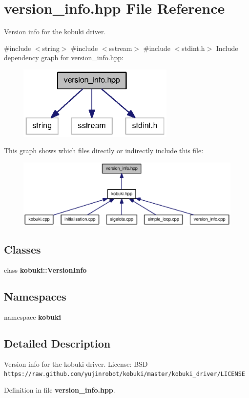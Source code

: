 \section{version\-\_\-info.\-hpp \-File \-Reference}
\label{version__info_8hpp}


\-Version info for the kobuki driver.  


{\ttfamily \#include $<$string$>$}\*
{\ttfamily \#include $<$sstream$>$}\*
{\ttfamily \#include $<$stdint.\-h$>$}\*
\-Include dependency graph for version\-\_\-info.\-hpp\-:
\nopagebreak
\begin{figure}[H]
\begin{center}
\leavevmode
\includegraphics[width=220pt]{version__info_8hpp__incl}
\end{center}
\end{figure}
\-This graph shows which files directly or indirectly include this file\-:
\nopagebreak
\begin{figure}[H]
\begin{center}
\leavevmode
\includegraphics[width=350pt]{version__info_8hpp__dep__incl}
\end{center}
\end{figure}
\subsection*{\-Classes}
\begin{DoxyCompactItemize}
\item 
class {\bf kobuki\-::\-Version\-Info}
\end{DoxyCompactItemize}
\subsection*{\-Namespaces}
\begin{DoxyCompactItemize}
\item 
namespace {\bf kobuki}
\end{DoxyCompactItemize}


\subsection{\-Detailed \-Description}
\-Version info for the kobuki driver. \-License\-: \-B\-S\-D {\tt https\-://raw.\-github.\-com/yujinrobot/kobuki/master/kobuki\-\_\-driver/\-L\-I\-C\-E\-N\-S\-E} 

\-Definition in file {\bf version\-\_\-info.\-hpp}.


